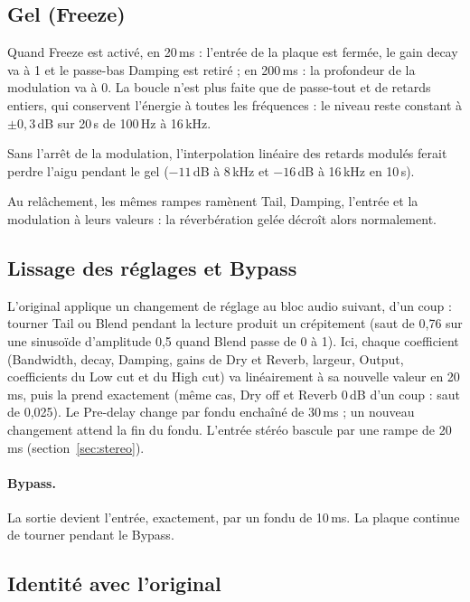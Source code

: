 \documentclass[a4paper,11pt]{article}
\newcommand{\dB}{\,dB}
\begin{document}
\subsection{Gel (Freeze)}\label{sec:freeze}

Quand Freeze est activé, en 20\,ms : l'entrée de la plaque est fermée, le gain decay va à 1 et
le passe-bas Damping est retiré ; en 200\,ms : la profondeur de la modulation va à 0. La boucle
n'est plus faite que de passe-tout et de retards entiers, qui conservent l'énergie à toutes les
fréquences : le niveau reste constant à $\pm0{,}3$\dB{} sur 20\,s de 100\,Hz à 16\,kHz.

Sans l'arrêt de la modulation, l'interpolation linéaire des retards modulés ferait perdre
l'aigu pendant le gel ($-11$\dB{} à 8\,kHz et $-16$\dB{} à 16\,kHz en 10\,s).

Au relâchement, les mêmes rampes ramènent Tail, Damping, l'entrée et la modulation à leurs
valeurs : la réverbération gelée décroît alors normalement.

\subsection{Lissage des réglages et Bypass}\label{sec:lissage}

L'original applique un changement de réglage au bloc audio suivant, d'un coup : tourner Tail ou
Blend pendant la lecture produit un crépitement (saut de 0,76 sur une sinusoïde d'amplitude
0,5 quand Blend passe de 0 à 1). Ici, chaque coefficient (Bandwidth, decay, Damping, gains de
Dry et Reverb, largeur, Output, coefficients du Low cut et du High cut) va linéairement à sa nouvelle valeur en
20\,ms, puis la prend exactement (même cas, Dry off et Reverb 0\dB{} d'un coup : saut de 0,025). Le Pre-delay change par fondu
enchaîné de 30\,ms ; un nouveau changement attend la fin du fondu. L'entrée stéréo bascule par
une rampe de 20\,ms (section~\ref{sec:stereo}).

\paragraph{Bypass.} La sortie devient l'entrée, exactement, par un fondu de 10\,ms. La plaque
continue de tourner pendant le Bypass.

\subsection{Identité avec l'original}\label{sec:identite}
\end{document}
